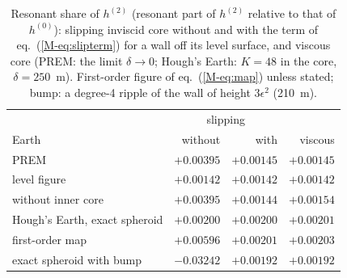 \begin{table}
\caption{Resonant share of $h^{(2)}$ (resonant part of $h^{(2)}$ relative to
that of $h^{(0)}$): slipping inviscid core without and with the term of
eq.~(\ref{M-eq:slipterm}) for a wall off its level surface, and viscous core
(PREM: the limit $\delta\to0$; Hough's Earth: $K=48$ in the core,
$\delta=250$~m). First-order figure of eq.~(\ref{M-eq:map}) unless stated;
bump: a degree-4 ripple of the wall of height $3\epsilon^2$ (210~m).}
\label{tab:slipshare}
\small
\centering
\begin{tabular}{@{}lrrr@{}}
\toprule
 & \multicolumn{2}{c}{slipping} & \\
Earth & without & with & viscous \\
\midrule
PREM & $+0.00395$ & $+0.00145$ & $+0.00145$ \\
\quad level figure & $+0.00142$ & $+0.00142$ & $+0.00142$ \\
\quad without inner core & $+0.00395$ & $+0.00144$ & $+0.00154$ \\
Hough's Earth, exact spheroid & $+0.00200$ & $+0.00200$ & $+0.00201$ \\
\quad first-order map & $+0.00596$ & $+0.00201$ & $+0.00203$ \\
\quad exact spheroid with bump & $-0.03242$ & $+0.00192$ & $+0.00192$ \\
\bottomrule
\end{tabular}
\end{table}
